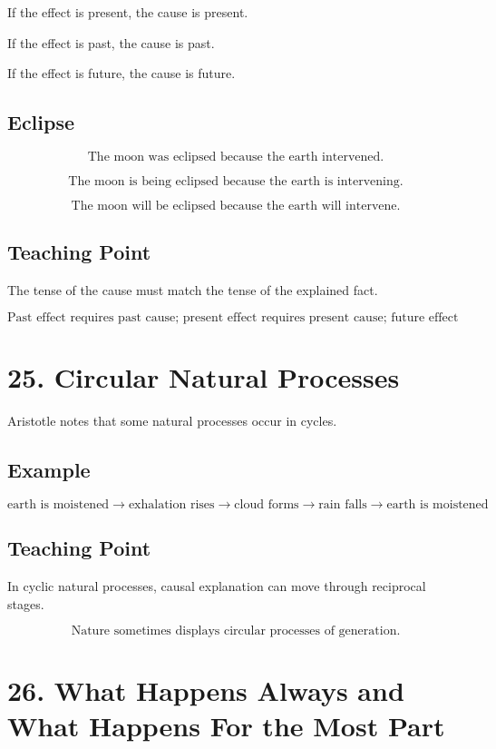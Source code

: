\documentclass[12pt]{article}
\begin{document}
If the effect is present, the cause is present.

If the effect is past, the cause is past.

If the effect is future, the cause is future.

\subsection*{Eclipse}

\[
\text{The moon was eclipsed because the earth intervened.}
\]

\[
\text{The moon is being eclipsed because the earth is intervening.}
\]

\[
\text{The moon will be eclipsed because the earth will intervene.}
\]

\subsection*{Teaching Point}

The tense of the cause must match the tense of the explained fact.

\[
\boxed{
\text{Past effect requires past cause; present effect requires present cause; future effect requires future cause.}
}
\]

\section*{25. Circular Natural Processes}

Aristotle notes that some natural processes occur in cycles.

\subsection*{Example}

\[
\text{earth is moistened}
\rightarrow
\text{exhalation rises}
\rightarrow
\text{cloud forms}
\rightarrow
\text{rain falls}
\rightarrow
\text{earth is moistened}
\]

\subsection*{Teaching Point}

In cyclic natural processes, causal explanation can move through reciprocal
stages.

\[
\boxed{
\text{Nature sometimes displays circular processes of generation.}
}
\]

\section*{26. What Happens Always and What Happens For the Most Part}
\end{document}
